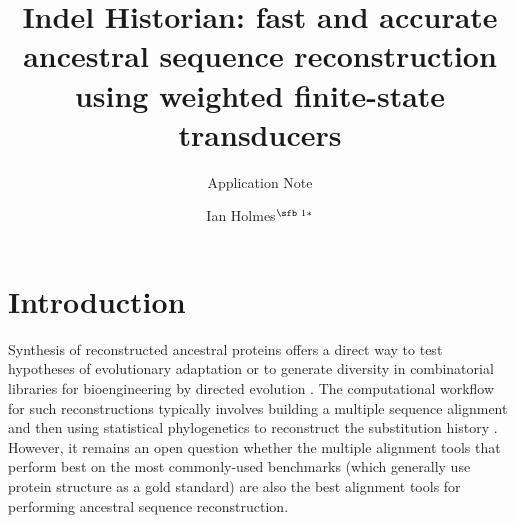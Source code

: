 \documentclass{bioinfo}
\begin{document}

\subtitle{Application Note}

\title[Indel Historian: phylogenetic ancestral reconstruction]{Indel Historian: fast and accurate ancestral sequence reconstruction using weighted finite-state transducers}
\author[Ian Holmes]{Ian Holmes$^{\text{\sfb 1}*}$}
\address{$^{\text{\sf 1}}$Department of Bioengineering, University of California, Berkeley, 94703, USA.}





\maketitle

\section{Introduction}

Synthesis of reconstructed ancestral proteins offers a direct way to test hypotheses of evolutionary adaptation \citep{UgaldeEtAl2004,OrtlundEtAl2007,GaucherEtAl2008}
or to generate diversity in combinatorial libraries for bioengineering by directed evolution \citep{AlcolombriEtAl2011,SantiagoOrtizEtAl2015}.
The computational workflow for such reconstructions typically involves building a multiple sequence alignment and then using statistical phylogenetics to reconstruct the substitution history
\citep{Liberles2007}.
However, it remains an open question whether the multiple alignment tools that perform best on the most commonly-used benchmarks
(which generally use protein structure as a gold standard)
are also the best alignment tools for performing ancestral sequence reconstruction.
\end{document}
